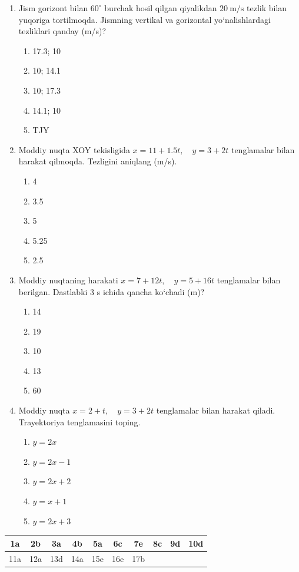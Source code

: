 \begin{enumerate}
\item Jism gorizont bilan $60^\circ$ burchak hosil qilgan qiyalikdan $20\ \text{m/s}$ tezlik bilan yuqoriga tortilmoqda. 
Jismning vertikal va gorizontal yo‘nalishlardagi tezliklari qanday (m/s)?
\begin{enumerate}[label=\Alph*)]
\item 17.3; 10
\item 10; 14.1
\item 10; 17.3
\item 14.1; 10
\item TJY
\end{enumerate}

\item Moddiy nuqta XOY tekisligida $x = 11 + 1.5t, \quad y = 3 + 2t$ tenglamalar bilan harakat qilmoqda. Tezligini aniqlang (m/s).
\begin{enumerate}[label=\Alph*)]
\item 4
\item 3.5
\item 5
\item 5.25
\item 2.5
\end{enumerate}

\item Moddiy nuqtaning harakati $x = 7 + 12t, \quad y = 5 + 16t$ tenglamalar bilan berilgan. Dastlabki 3 s ichida qancha ko‘chadi (m)?
\begin{enumerate}[label=\Alph*)]
\item 14
\item 19
\item 10
\item 13
\item 60
\end{enumerate}

\item Moddiy nuqta $ x = 2 + t, \quad y = 3 + 2t$ tenglamalar bilan harakat qiladi. Trayektoriya tenglamasini toping.
\begin{enumerate}[label=\Alph*)]
\item $y=2x$
\item $y=2x-1$
\item $y=2x+2$
\item $y=x+1$
\item $y=2x+3$
\end{enumerate}


\end{enumerate}



\begin{table}[h!]
\centering
\begin{tabular}{|c|c|c|c|c|c|c|c|c|c|}
\hline
1a & 2b & 3a & 4b & 5a & 6c & 7e & 8c & 9d & 10d \\ \hline
11a & 12a & 13d & 14a & 15e & 16e & 17b &  &  &  \\ \hline
\end{tabular}
\end{table}

